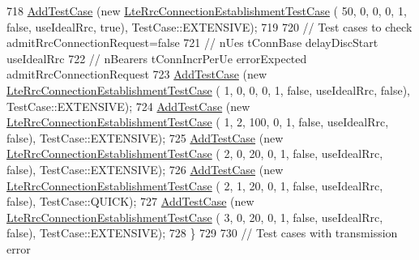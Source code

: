 \begin{DoxyCode}
718       \hyperlink{classns3_1_1TestCase_a3718088e3eefd5d6454569d2e0ddd835}{AddTestCase} (\textcolor{keyword}{new} \hyperlink{classLteRrcConnectionEstablishmentTestCase}{LteRrcConnectionEstablishmentTestCase}
       ( 50,     0,      0,           0,           1, \textcolor{keyword}{false}, useIdealRrc, \textcolor{keyword}{true}), TestCase::EXTENSIVE);
719 
720       \textcolor{comment}{// Test cases to check admitRrcConnectionRequest=false}
721       \textcolor{comment}{//                                                     nUes      tConnBase            delayDiscStart 
              useIdealRrc}
722       \textcolor{comment}{//                                                        nBearers       tConnIncrPerUe      
       errorExpected               admitRrcConnectionRequest}
723       \hyperlink{classns3_1_1TestCase_a3718088e3eefd5d6454569d2e0ddd835}{AddTestCase} (\textcolor{keyword}{new} \hyperlink{classLteRrcConnectionEstablishmentTestCase}{LteRrcConnectionEstablishmentTestCase}
       (  1,     0,      0,           0,           1, \textcolor{keyword}{false}, useIdealRrc, \textcolor{keyword}{false}), TestCase::EXTENSIVE);
724       \hyperlink{classns3_1_1TestCase_a3718088e3eefd5d6454569d2e0ddd835}{AddTestCase} (\textcolor{keyword}{new} \hyperlink{classLteRrcConnectionEstablishmentTestCase}{LteRrcConnectionEstablishmentTestCase}
       (  1,     2,    100,           0,           1, \textcolor{keyword}{false}, useIdealRrc, \textcolor{keyword}{false}), TestCase::EXTENSIVE);
725       \hyperlink{classns3_1_1TestCase_a3718088e3eefd5d6454569d2e0ddd835}{AddTestCase} (\textcolor{keyword}{new} \hyperlink{classLteRrcConnectionEstablishmentTestCase}{LteRrcConnectionEstablishmentTestCase}
       (  2,     0,     20,           0,           1, \textcolor{keyword}{false}, useIdealRrc, \textcolor{keyword}{false}), TestCase::EXTENSIVE);
726       \hyperlink{classns3_1_1TestCase_a3718088e3eefd5d6454569d2e0ddd835}{AddTestCase} (\textcolor{keyword}{new} \hyperlink{classLteRrcConnectionEstablishmentTestCase}{LteRrcConnectionEstablishmentTestCase}
       (  2,     1,     20,           0,           1, \textcolor{keyword}{false}, useIdealRrc, \textcolor{keyword}{false}), TestCase::QUICK);
727       \hyperlink{classns3_1_1TestCase_a3718088e3eefd5d6454569d2e0ddd835}{AddTestCase} (\textcolor{keyword}{new} \hyperlink{classLteRrcConnectionEstablishmentTestCase}{LteRrcConnectionEstablishmentTestCase}
       (  3,     0,     20,           0,           1, \textcolor{keyword}{false}, useIdealRrc, \textcolor{keyword}{false}), TestCase::EXTENSIVE);
728     \}
729 
730   \textcolor{comment}{// Test cases with transmission error}

\end{DoxyCode}
